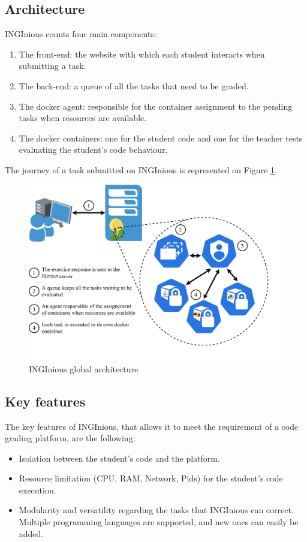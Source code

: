 \subsection{Architecture}
INGInious counts four main components:
\begin{enumerate}
  \item The front-end: the website with which each student interacts when submitting a task.
  \item The back-end: a queue of all the tasks that need to be graded.
  \item The docker agent: responsible for the container assignment to the pending tasks when resources are available.
  \item The docker containers: one for the student code and one for the teacher tests evaluating the student's code behaviour.
\end{enumerate}
The journey of a task submitted on INGInious is represented on Figure \ref{fig:architecture}.
\begin{figure}[!h]
  \begin{center}
    \includegraphics[width=\linewidth]{images/Architecture.pdf}
    \caption{INGInious global architecture}
    \label{fig:architecture}
  \end{center}
\end{figure}

\subsection{Key features}
The key features of INGInious, that allows it to meet the requirement of a code grading platform, are the following:
\begin{itemize}
  \item Isolation between the student's code and the platform.
  \item Resource limitation (CPU, RAM, Network, Pids) for the student's code execution.
  \item Modularity and versatility regarding the tasks that INGInious can correct.  Multiple programming languages are supported, and new ones can easily be added.
\end{itemize}

